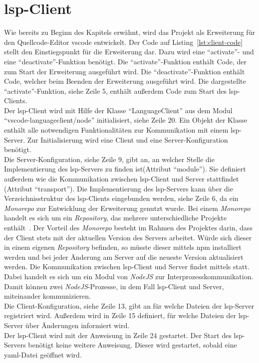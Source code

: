 \section{\acs{lsp}-Client}\label{sec:lsp-client}

Wie bereits zu Beginn des Kapitels erwähnt, wird das Projekt als Erweiterung für den Quellcode-Editor \ac{vscode} entwickelt.
Der Code auf Listing~\ref{lst:client-code} stellt den Einstiegspunkt für die Erweiterung dar.
Dazu wird eine ``activate''- und eine ``deactivate''-Funktion benötigt. Die ``activate''-Funktion enthält Code, der zum Start der Erweiterung ausgeführt wird.
Die ``deactivate''-Funktion enthält Code, welcher beim Beenden der Erweiterung ausgeführt wird.
Die dargestellte ``activate''-Funktion, siehe Zeile 5, enthält außerdem Code zum Start des \ac{lsp}-Clients.
\\
Der \ac{lsp}-Client wird mit Hilfe der Klasse ``LanguageClient'' aus dem Modul ``vscode-languageclient/node'' initialisiert, siehe Zeile 20.
Ein Objekt der Klasse enthält alle notwendigen Funktionalitäten zur Kommunikation mit einem \ac{lsp}-Server.
Zur Initialisierung wird eine Client und eine Server-Konfiguration benötigt.
\\
Die Server-Konfiguration, siehe Zeile 9, gibt an, an welcher Stelle die Implementierung des \ac{lsp}-Servers zu finden ist(Attribut ``module'').
Sie definiert außerdem wie die Kommunikation zwischen \ac{lsp}-Client und Server stattfindet (Attribut ``transport'').
Die Implementierung des \ac{lsp}-Servers kann über die Verzeichnisstruktur des \ac{lsp}-Clients eingebunden werden, siehe Zeile 6, da
ein \textit{Monorepo} zur Entwicklung der Erweiterung genutzt wurde.
Bei einem \textit{Monorepo} handelt es sich um ein \textit{Repository}, das mehrere unterschiedliche Projekte enthält~\cite{monorepo-narwhal}.
Der Vorteil des \textit{Monorepo} besteht im Rahmen des Projektes darin, dass der Client stets mit der aktuellen Version des Servers arbeitet.
Würde sich dieser in einem eigenen \textit{Repository} befinden, so müsste dieser mittels \ac{npm} installiert werden und bei jeder Änderung am Server auf
die neueste Version aktualisiert werden.
Die Kommunikation zwischen \ac{lsp}-Client und Server findet mittels  statt. Dabei handelt es sich um ein Modul von \textit{NodeJS}
zur Interprozesskommunikation. Damit können zwei \textit{NodeJS}-Prozesse, in dem Fall \acs{lsp}-Client und Server, miteinander kommunizieren.
\\
Die Client-Konfiguration, siehe Zeile 13, gibt an für welche Dateien der \ac{lsp}-Server registriert wird. Außerdem wird in Zeile 15 definiert,
für welche Dateien der \ac{lsp}-Server über Änderungen informiert wird.
\\
Der \ac{lsp}-Client wird mit der Anweisung in Zeile 24 gestartet. Der Start des \ac{lsp}-Servers benötigt keine weitere Anweisung.
Dieser wird gestartet, sobald eine \ac{yaml}-Datei geöffnet wird.


